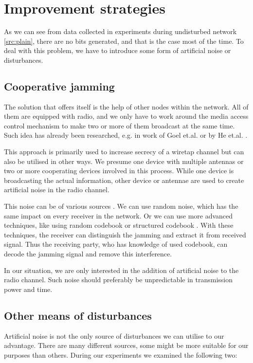 \documentclass[
  print, %
  Table,   %
  nolof,     %
  nolot,     %
           oneside
]{fithesis3}
\begin{document}
  \section{Improvement strategies}
  As we can see from data collected in experiments during undisturbed network \ref{src:plain}, there are no bits generated, and that is the case most of the time. To deal with this problem, we have to introduce some form of artificial noise or disturbances.

  \subsection{Cooperative jamming}\label{subsec:jammer}
  The solution that offers itself is the help of other nodes within the network. All of them are equipped with radio, and we only have to work around the media access control mechanism to make two or more of them broadcast at the same time. Such idea has already been researched, e.g. in work of Goel et.al. \cite{Goel2008Noise} or by He et.al. \cite{He2010Jamming}.

  This approach is primarily used to increase secrecy of a wiretap channel \cite{wyner1975wire} but can also be utilised in other ways. We presume one device with multiple antennas or two or more cooperating devices involved in this process. While one device is broadcasting the actual information, other device or antennae are used to create artificial noise in the radio channel.

  This noise can be of various sources \cite{He2010Jamming}. We can use random noise, which has the same impact on every receiver in the network. Or we can use more advanced techniques, like using random codebook or structured codebook \cite{He2010Jamming}. With these techniques, the receiver can distinguish the jamming and extract it from received signal. Thus the receiving party, who has knowledge of used codebook, can decode the jamming signal and remove this interference.

  In our situation, we are only interested in the addition of artificial noise to the radio channel. Such noise should preferably be unpredictable in transmission power and time.

  \subsection{Other means of disturbances}\label{subsec:people}
  Artificial noise is not the only source of disturbances we can utilise to our advantage. There are many different sources, some might be more suitable for our purposes than others. During our experiments we examined the following two:
\end{document}
